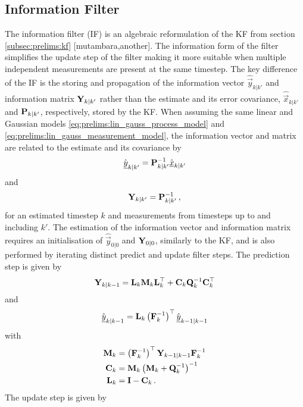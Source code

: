 \subsection{Information Filter}\label{subsec:prelims:if}
The information filter (IF) is an algebraic reformulation of the KF from section \ref{subsec:prelims:kf} [mutambara,another]. The information form of the filter simplifies the update step of the filter making it more suitable when multiple independent measurements are present at the same timestep. The key difference of the IF is the storing and propagation of the information vector $\hat{\vec{y}}_{k|k'}$ and information matrix ${{\mathbf{Y}}}_{k|k'}$ rather than the estimate and its error covariance, $\hat{\vec{x}}_{k|k'}$ and ${{\mathbf{P}}}_{k|k'}$, respectively, stored by the KF. When assuming the same linear and Gaussian models \eqref{eq:prelims:lin_gauss_process_model} and \eqref{eq:prelims:lin_gauss_measurement_model}, the information vector and matrix are related to the estimate and its covariance by
\begin{equation}\label{eq:prelims:if_vec_from_est}
    \hat{{\underline{y}}}_{k|k'} = {{\mathbf{P}}}_{k|k'}^{-1}\hat{{\underline{x}}}_{k|k'}
\end{equation}
and
\begin{equation}\label{eq:prelims:if_mat_from_cov}
    {\ensuremath{{\mathbf{Y}}}}_{k|k'} = {{\mathbf{P}}}_{k|k'}^{-1}\,,
\end{equation}
for an estimated timestep $k$ and measurements from timesteps up to and including $k'$. The estimation of the information vector and information matrix requires an initialisation of $\hat{\vec{y}}_{0|0}$ and ${{\mathbf{Y}}}_{0|0}$, similarly to the KF, and is also performed by iterating distinct predict and update filter steps. The prediction step is given by
\begin{equation}
    {\ensuremath{{\mathbf{Y}}}}_{k|k-1} = {{\mathbf{L}}}_k{{\mathbf{M}}}_k{{\mathbf{L}}}_k^\top + {{\mathbf{C}}}_k{{\mathbf{Q}}}_k^{-1}{{\mathbf{C}}}_k^\top
\end{equation}
and
\begin{equation}
    \hat{{\underline{y}}}_{k|k-1} = {{\mathbf{L}}}_k\left({{\mathbf{F}}}_k^{-1}\right)^\top\hat{{\underline{y}}}_{k-1|k-1}
\end{equation}
with
\begin{align}
    {\ensuremath{{\mathbf{M}}}}_k &= \left({{\mathbf{F}}}_k^{-1}\right)^\top{\ensuremath{{\mathbf{Y}}}}_{k-1|k-1}{{\mathbf{F}}}_k^{-1}\\
    {{\mathbf{C}}}_k &= {{\mathbf{M}}}_k\left({{\mathbf{M}}}_k + {{\mathbf{Q}}}_k^{-1}\right)^{-1}\\
    {{\mathbf{L}}}_k &= {{\mathbf{I}}} - {{\mathbf{C}}}_k\,.
\end{align}
The update step is given by
